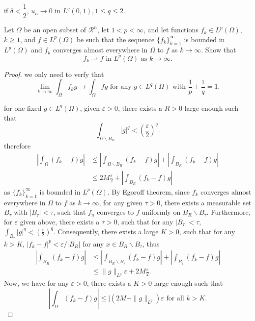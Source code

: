 if $\delta < \dfrac{1}{2}$, $u_n\rightarrow0$ in $L^q(0,1), 1\leqslant q \leqslant 2$.

\begin{lemma}
Let $\Omega$ be an open subset of $\mathcal{R}^n$, let $1<p<\infty$, and let functions $f_k\in L^p(\Omega)$, $k\geqslant1$, and $f\in L^p(\Omega)$ be such that the sequence $\{f_k\}_{k=1}^{\infty}$ is bounded in $L^p(\Omega)$ and $f_k$ converges almost everywhere in $\Omega$ to $f$ as $k\rightarrow \infty$. Show that 
\begin{equation}
	f_k\rightharpoonup f \text{ in } L^p(\Omega) \text{ as } k\rightarrow \infty.
\end{equation}	
\end{lemma}

\begin{proof}
	we only need to verfy that
	\begin{equation}
		\lim_{k\rightarrow\infty}\int_\Omega f_kg\rightarrow\int_\Omega fg \text{ for any } g\in L^q(\Omega) \text{ with } \frac1p+\frac1q=1.
	\end{equation}

	for one fixed $g\in L^q(\Omega)$, given $\varepsilon>0$, there exists a $R>0$ large enough such that 
	\begin{equation}
		\int_{\Omega\backslash B_R}|g|^q < (\frac\varepsilon2)^q.
	\end{equation}
therefore 
\begin{equation}
	\begin{split}
	|\int_\Omega(f_k-f)g|&\leqslant|\int_{\Omega\backslash B_R}(f_k-f)g| + |\int_{B_R}(f_k-f)g|\\
	&\leqslant 2M\frac\varepsilon2 + |\int_{B_R}(f_k-f)g|
\end{split}
\end{equation}
as $\{f_k\}_{k=1}^{\infty}$ is bounded in $L^p(\Omega)$. By Egoroff theorem, since $f_k$ converges almost everywhere in $\Omega$ to $f$ as $k\rightarrow \infty$, for any given $\tau>0$, there exists a measurable set $B_\tau$ with $|B_\tau|<\tau$, such that $f_n$ converges to $f$ uniformly on $B_R\backslash B_\tau$. Furthermore, for $\varepsilon$ given above, there exists a $\tau>0$, such that for any $|B_\tau|<\tau$, $\int_{B_\tau}|g|^q<(\frac{\varepsilon}{2})^q.$ Consequently, there exists a large $K>0$, such that for any $k>K$, $|f_k-f|^p<\varepsilon/|B_R|$ for any $x\in B_R\backslash B_\tau$, thus
\begin{equation}
	\begin{split}
		|\int_{B_R}(f_k-f)g|&\leqslant |\int_{B_R\backslash B_\tau}(f_k-f)g| + |\int_{B_\tau}(f_k-f)g|\\
		&\leqslant \|g\|_{L^q}\varepsilon +2M\frac{\varepsilon}{2}.
	\end{split}
\end{equation}
Now, we have for any $\varepsilon>0$, there exists a $K>0$ large enough such that 
\begin{equation}
	|\int_\Omega(f_k-f)g|\leqslant| (2M+ \|g\|_{L^q})\varepsilon \text{ for all } k> K.
\end{equation}
\end{proof}


